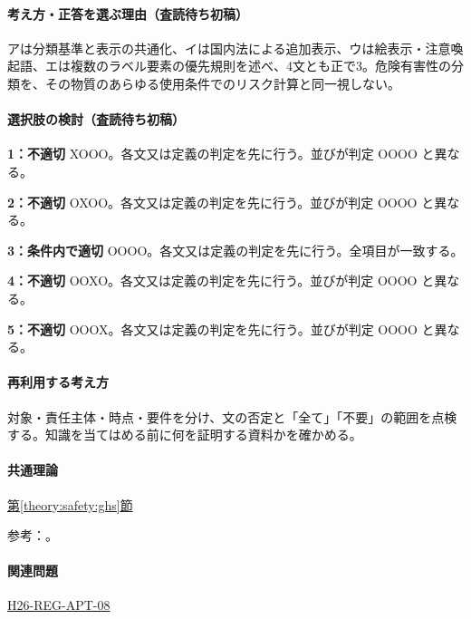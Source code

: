\paragraph{考え方・正答を選ぶ理由（査読待ち初稿）} アは分類基準と表示の共通化、イは国内法による追加表示、ウは絵表示・注意喚起語、エは複数のラベル要素の優先規則を述べ、4文とも正で3。危険有害性の分類を、その物質のあらゆる使用条件でのリスク計算と同一視しない。

\paragraph{選択肢の検討（査読待ち初稿）}\mbox{}\par

\noindent\textbf{1：不適切} XOOO。各文又は定義の判定を先に行う。並びが判定 OOOO と異なる。\par

\noindent\textbf{2：不適切} OXOO。各文又は定義の判定を先に行う。並びが判定 OOOO と異なる。\par

\noindent\textbf{3：条件内で適切} OOOO。各文又は定義の判定を先に行う。全項目が一致する。\par

\noindent\textbf{4：不適切} OOXO。各文又は定義の判定を先に行う。並びが判定 OOOO と異なる。\par

\noindent\textbf{5：不適切} OOOX。各文又は定義の判定を先に行う。並びが判定 OOOO と異なる。\par

\paragraph{再利用する考え方} 対象・責任主体・時点・要件を分け、文の否定と「全て」「不要」の範囲を点検する。知識を当てはめる前に何を証明する資料かを確かめる。

\paragraph{共通理論} \hyperref[theory:safety:ghs]{第\ref*{theory:safety:ghs}節}

\par 参考：\cite{saf53_ghs_old,saf53_ghs_notice}。

\paragraph{関連問題} \hyperref[q:h26-reg-apt-08]{H26-REG-APT-08}

